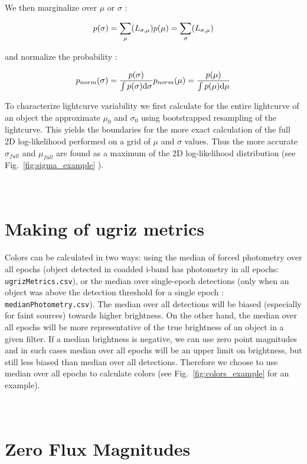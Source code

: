 \documentclass[fleqn,usenatbib]{mnras}  %
\begin{document}
We then marginalize over $\mu$ or $\sigma$ : 

\begin{equation}
p(\sigma) = \sum_{\mu}(L_{\sigma,\mu}) \\
p(\mu) = \sum_{\sigma}(L_{\sigma,\mu})
\end{equation}

and normalize the probability :

\begin{equation}
p_{norm}(\sigma) = \frac{p(\sigma)}{ \int {p(\sigma) \text{d}\sigma}} \\ 
p_{norm}(\mu) = \frac{p(\mu)} {\int {p(\mu) \text{d}\mu} }
\end{equation}


To characterize  lightcurve variability we first calculate for the entire lightcurve of an object  the approximate $\mu_{0}$ and $\sigma_{0}$ using bootstrapped resampling of the lightcurve.  This yields the boundaries for the more exact calculation of the full 2D log-likelihood performed on a grid of $\mu$ and $\sigma$ values. Thus the more accurate $\sigma_{full}$ and $\mu_{full}$ are found as a maximum of the 2D log-likelihood distribution (see Fig.~\ref{fig:sigma_example} ).



\section{\\ Making of ugriz metrics }
\label{App:AppendixC}

Colors can be calculated in two ways: using the median of forced photometry over all epochs (object detected in coadded i-band has photometry in all epochs:  \verb|ugrizMetrics.csv|), or the median over single-epoch detections (only when an object was above the detection threshold for a single epoch : \verb|medianPhotometry.csv|).  
The median over all detections will be biased (especially for faint sources) towards higher brightness.  On the other hand, the median over all epochs will be more representative of the true brightness of an object in a given filter.  If a median brightness is negative, we can use zero point magnitudes and in such cases median over all epochs will be an upper limit on brightness, but still less biased than median over all detections. Therefore  we choose to use median over all epochs to calculate colors (see Fig.~\ref{fig:colors_example} for an example).  

\section{\\ Zero Flux Magnitudes }
\label{App:AppendixD}
\end{document}
